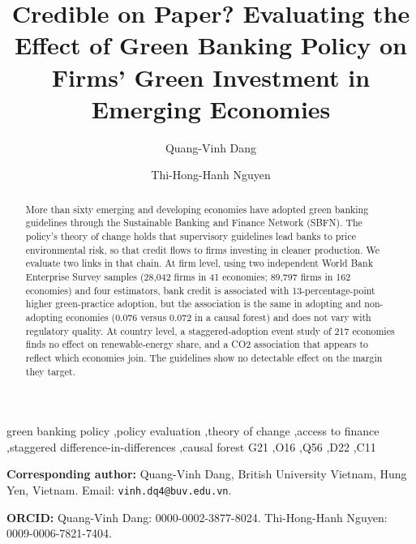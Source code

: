 \documentclass[review,authoryear,12pt]{elsarticle}
\begin{document}
\begin{frontmatter}

\title{Credible on Paper? Evaluating the Effect of Green Banking Policy on Firms' Green Investment in Emerging Economies}

\author[buv]{Quang-Vinh Dang}

\author[bav]{Thi-Hong-Hanh Nguyen}


\address[buv]{British University Vietnam, Hung Yen, Vietnam}
\address[bav]{Banking Academy Vietnam, Hanoi, Vietnam}

\begin{abstract}
More than sixty emerging and developing economies have adopted green banking guidelines through the Sustainable Banking and Finance Network (SBFN). The policy's theory of change holds that supervisory guidelines lead banks to price environmental risk, so that credit flows to firms investing in cleaner production. We evaluate two links in that chain. At firm level, using two independent World Bank Enterprise Survey samples (28{,}042 firms in 41 economies; 89{,}797 firms in 162 economies) and four estimators, bank credit is associated with 13-percentage-point higher green-practice adoption, but the association is the same in adopting and non-adopting economies (0.076 versus 0.072 in a causal forest) and does not vary with regulatory quality. At country level, a staggered-adoption event study of 217 economies finds no effect on renewable-energy share, and a CO2 association that appears to reflect which economies join. The guidelines show no detectable effect on the margin they target.
\end{abstract}

\begin{keyword}
green banking policy \sep policy evaluation \sep theory of change \sep access to finance \sep staggered difference-in-differences \sep causal forest
\JEL G21 \sep O16 \sep Q56 \sep D22 \sep C11
\end{keyword}

\end{frontmatter}

\vspace{1cm}
\noindent\textbf{Corresponding author:} Quang-Vinh Dang, British University Vietnam, Hung Yen, Vietnam. Email: \texttt{vinh.dq4@buv.edu.vn}.

\vspace{0.5cm}
\noindent\textbf{ORCID:} Quang-Vinh Dang: 0000-0002-3877-8024. Thi-Hong-Hanh Nguyen: 0009-0006-7821-7404.
\end{document}
